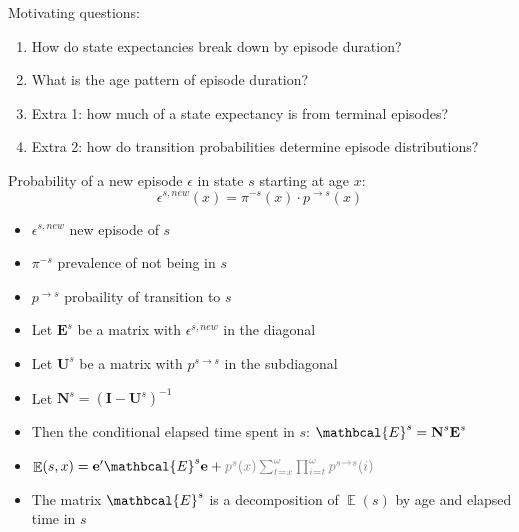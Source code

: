 \documentclass[20pt,usenames,dvipsnames]{beamer}
\DeclareMathOperator{\EX}{\mathbb{E}}%
\begin{document}
\begin{frame}[plain]
\Large
\centering
 Motivating questions:\vspace{2em}
 \begin{enumerate}[<+->]
 \item How do state expectancies break down by episode duration?
 \item What is the age pattern of episode duration?
 \item Extra 1: how much of a state expectancy is from terminal episodes?
 \item Extra 2: how do transition probabilities determine episode distributions?
 \end{enumerate}
\end{frame}
\begin{frame}[plain]
\Large
\centering
 Probability of a new episode $\epsilon$ in state $s$ starting at age $x$:\vspace{2em}
 \begin{equation}
 \epsilon^{s,new}(x) = \pi^{-s}(x) \cdot p^{\rightarrow s}(x)
 \end{equation}
 \begin{itemize}
 \item $\epsilon^{s,new}$ new episode of $s$
 \item $\pi^{-s}$ prevalence of not being in $s$
 \item $p^{\rightarrow s}$ probaility of transition to $s$
 \end{itemize}
\end{frame}

\begin{frame}[plain]
\Large
\begin{itemize}[<+->]
\item Let $\textbf{E}^s$ be a matrix with $\epsilon^{s,new}$ in the diagonal
\item Let $\textbf{U}^s$ be a matrix with $p^{s\rightarrow s}$ in the subdiagonal
\item Let $\textbf{N}^s = \left( \textbf{I} - \textbf{U}^s \right)^{-1}$ 
\item Then the conditional elapsed time spent in $s$: $\mathbcal{E}^s = \textbf{N}^s \textbf{E}^s$
\item $\EX(s,x) = \textbf{e}' \mathbcal{E}^s \textbf{e} + \textcolor{mygray2}{p^s(x) \sum_{t=x}^\omega \prod_{i=t}^\omega p^{s\rightarrow s}(i)}$ 
\item The matrix $\mathbcal{E}^s$ is a decomposition of  $\EX(s)$ by age and elapsed time in $s$
\end{itemize}

\end{frame}
\end{document}

